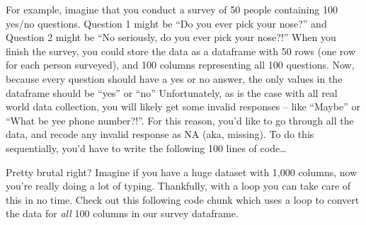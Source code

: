 \documentclass[]{book}
\newenvironment{Shaded}{\begin{snugshade}}{\end{snugshade}}
\newcommand{\KeywordTok}[1]{\textcolor[rgb]{0.13,0.29,0.53}{\textbf{#1}}}
\newcommand{\DecValTok}[1]{\textcolor[rgb]{0.00,0.00,0.81}{#1}}
\newcommand{\StringTok}[1]{\textcolor[rgb]{0.31,0.60,0.02}{#1}}
\newcommand{\CommentTok}[1]{\textcolor[rgb]{0.56,0.35,0.01}{\textit{#1}}}
\newcommand{\OtherTok}[1]{\textcolor[rgb]{0.56,0.35,0.01}{#1}}
\newcommand{\OperatorTok}[1]{\textcolor[rgb]{0.81,0.36,0.00}{\textbf{#1}}}
\newcommand{\NormalTok}[1]{#1}
\theoremstyle{definition}
\theoremstyle{definition}
\theoremstyle{remark}
\begin{document}
For example, imagine that you conduct a survey of 50 people containing
100 yes/no questions. Question 1 might be ``Do you ever pick your
nose?'' and Question 2 might be ``No seriously, do you ever pick your
nose?!'' When you finish the survey, you could store the data as a
dataframe with 50 rows (one row for each person surveyed), and 100
columns representing all 100 questions. Now, because every question
should have a yes or no answer, the only values in the dataframe should
be ``yes'' or ``no'' Unfortunately, as is the case with all real world
data collection, you will likely get some invalid responses -- like
``Maybe'' or ``What be yee phone number?!''. For this reason, you'd like
to go through all the data, and recode any invalid response as NA (aka,
missing). To do this sequentially, you'd have to write the following 100
lines of code\ldots{}

\begin{Shaded}
\end{Shaded}

Pretty brutal right? Imagine if you have a huge dataset with 1,000
columns, now you're really doing a lot of typing. Thankfully, with a
loop you can take care of this in no time. Check out this following code
chunk which uses a loop to convert the data for \emph{all} 100 columns
in our survey dataframe.
\end{document}
